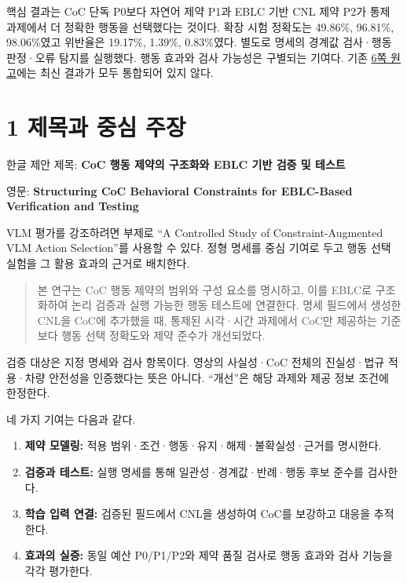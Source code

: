 \documentclass[11pt,a4paper]{article}
\begin{document}
핵심 결과는 CoC 단독 P0보다 자연어 제약 P1과 EBLC 기반 CNL 제약 P2가 통제 과제에서 더 정확한 행동을 선택했다는 것이다. 확장 시험 정확도는 49.86\%, 96.81\%, 98.06\%였고 위반율은 19.17\%, 1.39\%, 0.83\%였다. 별도로 명세의 경계값 검사·행동 판정·오류 탐지를 실행했다. 행동 효과와 검사 가능성은 구별되는 기여다. 기존 \href{\detokenize{../../../../../../projects/04-guardsynth-coc/paper/main.tex}}{6쪽 원고}에는 최신 결과가 모두 통합되어 있지 않다.\par

\clearpage{}\section*{1 제목과 중심 주장}

한글 제안 제목: \textbf{CoC 행동 제약의 구조화와 EBLC 기반 검증 및 테스트}\par

영문: \textbf{Structuring CoC Behavioral Constraints for EBLC-Based Verification and Testing}\par

VLM 평가를 강조하려면 부제로 “A Controlled Study of Constraint-Augmented VLM Action Selection”를 사용할 수 있다. 정형 명세를 중심 기여로 두고 행동 선택 실험을 그 활용 효과의 근거로 배치한다.\par

\begin{quote}본 연구는 CoC 행동 제약의 범위와 구성 요소를 명시하고, 이를 EBLC로 구조화하여 논리 검증과 실행 가능한 행동 테스트에 연결한다. 명세 필드에서 생성한 CNL을 CoC에 추가했을 때, 통제된 시각·시간 과제에서 CoC만 제공하는 기준보다 행동 선택 정확도와 제약 준수가 개선되었다.\end{quote}

검증 대상은 지정 명세와 검사 항목이다. 영상의 사실성·CoC 전체의 진실성·법규 적용·차량 안전성을 인증했다는 뜻은 아니다. “개선”은 해당 과제와 제공 정보 조건에 한정한다.\par

네 가지 기여는 다음과 같다.\par

\begin{enumerate}
\item \textbf{제약 모델링:} 적용 범위·조건·행동·유지·해제·불확실성·근거를 명시한다.
\item \textbf{검증과 테스트:} 실행 명세를 통해 일관성·경계값·반례·행동 후보 준수를 검사한다.
\item \textbf{학습 입력 연결:} 검증된 필드에서 CNL을 생성하여 CoC를 보강하고 대응을 추적한다.
\item \textbf{효과의 실증:} 동일 예산 P0/P1/P2와 제약 품질 검사로 행동 효과와 검사 기능을 각각 평가한다.
\end{enumerate}
\end{document}
